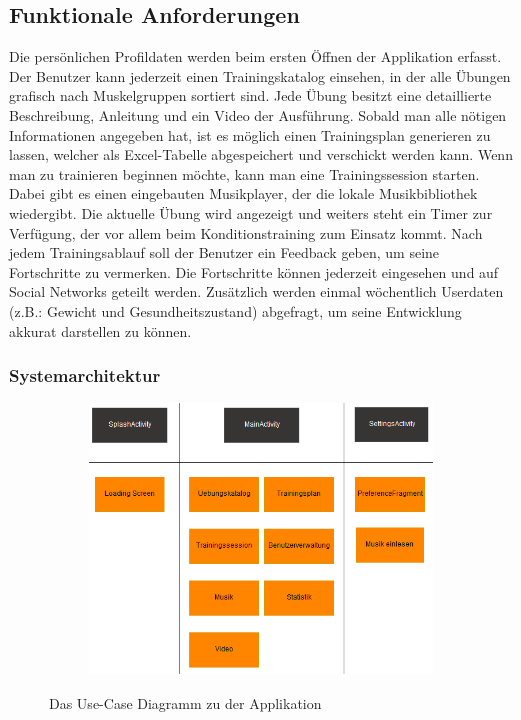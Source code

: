 \documentclass[FIPLY_base.tex]{subfiles}
\begin{document}
	\subsection{Funktionale Anforderungen}
	Die persönlichen Profildaten werden beim ersten Öffnen der Applikation erfasst. Der Benutzer kann jederzeit einen Trainingskatalog einsehen, in der alle Übungen grafisch nach Muskelgruppen sortiert sind. Jede Übung besitzt eine detaillierte Beschreibung, Anleitung und ein Video der Ausführung. Sobald man alle nötigen Informationen angegeben hat, ist es möglich einen Trainingsplan generieren zu lassen, welcher  als Excel-Tabelle abgespeichert und verschickt werden kann. Wenn man zu trainieren beginnen möchte, kann man eine Trainingssession starten. Dabei gibt es einen eingebauten Musikplayer, der die lokale Musikbibliothek wiedergibt. Die aktuelle Übung wird angezeigt und weiters steht ein Timer zur Verfügung, der vor allem beim Konditionstraining zum Einsatz kommt. Nach jedem Trainingsablauf soll der Benutzer ein Feedback geben, um seine Fortschritte zu vermerken. Die Fortschritte können jederzeit eingesehen und auf Social Networks geteilt werden. Zusätzlich werden einmal wöchentlich Userdaten (z.B.: Gewicht und Gesundheitszustand) abgefragt, um seine Entwicklung akkurat darstellen zu können.
	
	\subsubsection{Systemarchitektur}
	\begin{figure}[H]
		\begin{subfigure}[b]{0.3\textwidth}
			\centering
			\includegraphics[scale=0.6]{img/Systemarchitektur}
		\end{subfigure}
		\caption{Das Use-Case Diagramm zu der Applikation}
	\end{figure}
	\newpage
\end{document}

